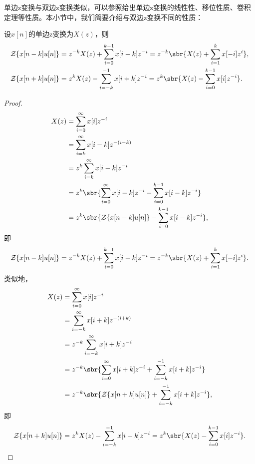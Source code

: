 单边z变换与双边z变换类似，可以参照给出单边z变换的线性性、移位性质、卷积定理等性质。本小节中，我们简要介绍与双边z变换不同的性质：
\begin{proposition}[单边z变换的移位性质]
    设$x[n]$的单边z变换为$X(z)$，则
    \begin{align}
        \mathcal{Z}\{x[n-k]u[n]\}&=z^{-k}X(z)+\sum_{i=0}^{k-1}x[i-k]z^{-i}=z^{-k}\sbr{X(z)+\sum_{i=1}^{k}x[-i]z^{i}}, \\
        \mathcal{Z}\{x[n+k]u[n]\}&=z^{k}X(z)-\sum_{i=-k}^{-1}x[i+k]z^{-i}=z^{k}\sbr{X(z)-\sum_{i=0}^{k-1}x[i]z^{-i}}.
    \end{align}
\end{proposition}
\begin{proof}
    \begin{align}
        X(z)&=\sum_{i=0}^{\infty}x[i]z^{-i} \nonumber \\
        &=\sum_{i=k}^{\infty}x[i-k]z^{-(i-k)} \nonumber \\
        &=z^{k}\sum_{i=k}^{\infty}x[i-k]z^{-i} \nonumber \\
        &=z^{k}\sbr{\sum_{i=0}^{\infty}x[i-k]z^{-i}-\sum_{i=0}^{k-1}x[i-k]z^{-i}} \nonumber \\
        &=z^{k}\sbr{\mathcal{Z}\{x[n-k]u[n]\}-\sum_{i=0}^{k-1}x[i-k]z^{-i}},
    \end{align}
    即
    \begin{equation}
        \mathcal{Z}\{x[n-k]u[n]\}=z^{-k}X(z)+\sum_{i=0}^{k-1}x[i-k]z^{-i}=z^{-k}\sbr{X(z)+\sum_{i=1}^{k}x[-i]z^{i}}.
    \end{equation}
    类似地，
    \begin{align}
        X(z)&=\sum_{i=0}^{\infty}x[i]z^{-i} \nonumber \\
        &=\sum_{i=-k}^{\infty}x[i+k]z^{-(i+k)} \nonumber \\
        &=z^{-k}\sum_{i=-k}^{\infty}x[i+k]z^{-i} \nonumber \\
        &=z^{-k}\sbr{\sum_{i=0}^{\infty}x[i+k]z^{-i}+\sum_{i=-k}^{-1}x[i+k]z^{-i}} \nonumber \\
        &=z^{-k}\sbr{\mathcal{Z}\{x[n+k]u[n]\}+\sum_{i=-k}^{-1}x[i+k]z^{-i}},
    \end{align}
    即
    \begin{equation}
        \mathcal{Z}\{x[n+k]u[n]\}=z^{k}X(z)-\sum_{i=-k}^{-1}x[i+k]z^{-i}=z^{k}\sbr{X(z)-\sum_{i=0}^{k-1}x[i]z^{-i}}.
    \end{equation}
\end{proof}

